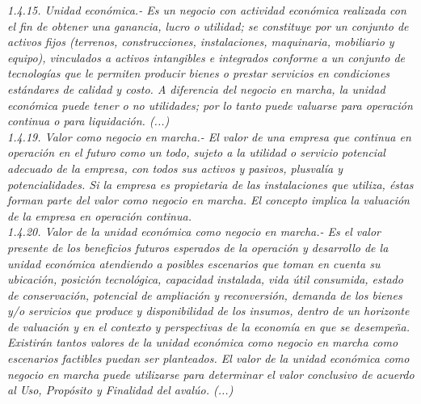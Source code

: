 \textit{\textcolor{principal}{1.4.15. Unidad econ\'omica}.- Es un negocio con actividad econ\'omica realizada con el fin de obtener una ganancia, lucro o utilidad; se constituye por un conjunto de activos fijos (terrenos, construcciones, instalaciones, maquinaria, mobiliario y equipo), vinculados a activos intangibles e integrados conforme a un conjunto de tecnolog\'ias que le permiten producir bienes o prestar servicios en condiciones est\'andares de calidad y costo. A diferencia del negocio en marcha, la unidad econ\'omica puede tener o no utilidades; por lo tanto puede valuarse para operaci\'on continua o para liquidaci\'on. (...)}\\

\textit{\textcolor{principal}{1.4.19. Valor como negocio en marcha}.- El valor de una empresa que continua en operaci\'on en el futuro como un todo, sujeto a la utilidad o servicio potencial adecuado de la empresa, con todos sus activos y pasivos, plusval\'ia y potencialidades. Si la empresa es propietaria de las instalaciones que utiliza, \'estas forman parte del valor como negocio en marcha. El concepto implica la valuaci\'on de la empresa en operaci\'on continua.}\\

\textit{\textcolor{principal}{1.4.20. Valor de la unidad econ\'omica como negocio en marcha}.- Es el valor presente de los beneficios futuros esperados de la operaci\'on y desarrollo de la unidad econ\'omica atendiendo a posibles escenarios que toman en cuenta su ubicaci\'on, posici\'on tecnol\'ogica, capacidad instalada, vida \'util consumida, estado de conservaci\'on, potencial de ampliaci\'on y reconversi\'on, demanda de los bienes y/o servicios que produce y disponibilidad de los insumos, dentro de un horizonte de valuaci\'on y en el contexto y perspectivas de la econom\'ia en que se desempe\~na. Existir\'an tantos valores de la unidad econ\'omica como negocio en marcha como escenarios factibles puedan ser planteados. El valor de la unidad econ\'omica como negocio en marcha puede utilizarse para determinar el valor conclusivo de acuerdo al Uso, Prop\'osito y Finalidad del aval\'uo. (...)}\\

